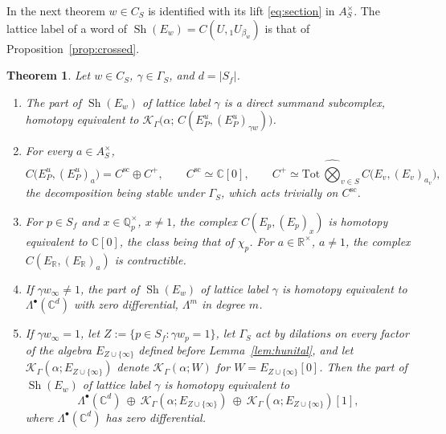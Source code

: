 \documentclass[11pt]{amsart}
\newtheorem{theorem}{Theorem}[section]
\theoremstyle{definition}
\theoremstyle{remark}
\newcommand{\C}{\mathbb C}
\newcommand{\R}{\mathbb R}
\newcommand{\Q}{\mathbb Q}
\newcommand{\Sh}{\operatorname{Sh}}
\begin{document}
In the next theorem $w\in C_S$ is identified with its lift \eqref{eq:section}
in $A_S^{\times}$.  The
lattice label of a word of $\Sh(E_w)=C(U,{}_{1}U_{\beta_w})$ is that of
Proposition~\ref{prop:crossed}.

\begin{theorem}\label{thm:shadow}
Let $w\in C_S$, $\gamma\in\Gamma_S$, and $d=|S_f|$.
\begin{enumerate}
\item[(a)] The part of $\Sh(E_w)$ of lattice label $\gamma$ is a direct
summand subcomplex, homotopy equivalent to
$\mathcal K_{\Gamma}\bigl(\alpha;\,C(E_P^{u},(E_P^{u})_{\gamma w})\bigr)$.
\item[(b)] For every $a\in A_S^{\times}$,
\[
C\bigl(E_P^{u},(E_P^{u})_{a}\bigr)=C^{\mathrm{sc}}\oplus C^{+},\qquad
C^{\mathrm{sc}}\simeq\C[0],\qquad
C^{+}\simeq\mathrm{Tot}\,\widehat\bigotimes_{v\in S}C\bigl(E_v,(E_v)_{a_v}\bigr),
\]
the decomposition being stable under $\Gamma_S$, which acts trivially on
$C^{\mathrm{sc}}$.
\item[(c)] For $p\in S_f$ and $x\in\Q_p^{\times}$, $x\ne1$, the complex
$C(E_p,(E_p)_{x})$ is homotopy equivalent to $\C[0]$, the class being that of
$\chi_p$.  For $a\in\R^{\times}$, $a\ne1$, the complex $C(E_{\R},(E_{\R})_{a})$
is contractible.
\item[(d)] If $\gamma w_{\infty}\ne1$, the part of $\Sh(E_w)$ of lattice label
$\gamma$ is homotopy equivalent to $\Lambda^{\bullet}(\C^{d})$ with zero
differential, $\Lambda^{m}$ in degree $m$.
\item[(e)] If $\gamma w_{\infty}=1$, let $Z:=\{p\in S_f:\gamma w_p=1\}$, let
$\Gamma_S$ act by dilations on every factor of the algebra
$E_{Z\cup\{\infty\}}$ defined before Lemma~\ref{lem:hunital}, and let
$\mathcal K_{\Gamma}(\alpha;E_{Z\cup\{\infty\}})$ denote
$\mathcal K_{\Gamma}(\alpha;W)$ for $W=E_{Z\cup\{\infty\}}[0]$.  Then the part of
$\Sh(E_w)$ of lattice label $\gamma$ is homotopy equivalent to
\[
\Lambda^{\bullet}(\C^{d})\ \oplus\ \mathcal K_{\Gamma}(\alpha;E_{Z\cup\{\infty\}})\ \oplus\
\mathcal K_{\Gamma}(\alpha;E_{Z\cup\{\infty\}})[1],
\]
where $\Lambda^{\bullet}(\C^{d})$ has zero differential.
\end{enumerate}
\end{theorem}
\end{document}
